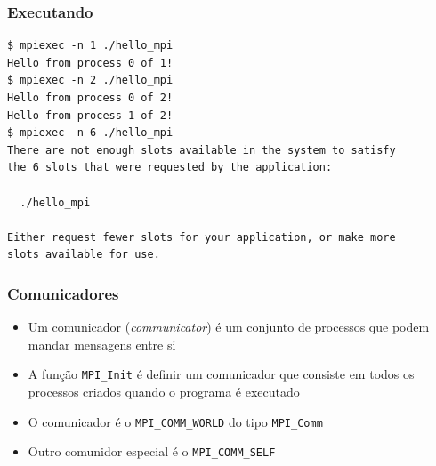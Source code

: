 \documentclass[xcolor={usenames,dvipsnames},12pt,presentation,aspectratio=169]{beamer}
\begin{document}
\begin{frame}[fragile]
  \frametitle{Executando}
\begin{center}
\begin{minipage}{0.95\textwidth}
  \begin{verbatim}
$ mpiexec -n 1 ./hello_mpi
Hello from process 0 of 1!
$ mpiexec -n 2 ./hello_mpi
Hello from process 0 of 2!
Hello from process 1 of 2!
$ mpiexec -n 6 ./hello_mpi
There are not enough slots available in the system to satisfy 
the 6 slots that were requested by the application:

  ./hello_mpi

Either request fewer slots for your application, or make more 
slots available for use.
  \end{verbatim}
\end{minipage}
\end{center}
\end{frame}
\begin{frame}[fragile]
  \frametitle{Comunicadores}
%
\begin{itemize}
  \item Um comunicador (\emph{communicator}) é um conjunto de processos que podem mandar mensagens entre si
  \item A função \texttt{MPI_Init} é definir um comunicador que consiste em todos os processos criados quando o programa é executado
  \item O comunicador é o \texttt{MPI_COMM_WORLD} do tipo \texttt{MPI_Comm}
  \item Outro comunidor especial é o \texttt{MPI_COMM_SELF}
\end{itemize}
\end{frame}
\end{document}
